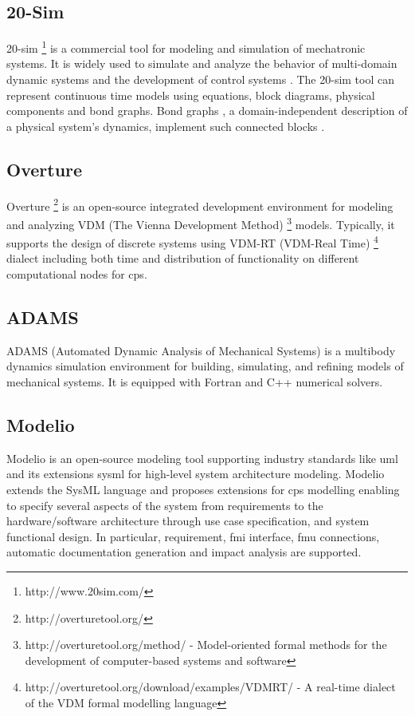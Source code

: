 \subsection{20-Sim}
\label{susec:20sim}


20-sim \footnote{http://www.20sim.com/} is a commercial tool for modeling and simulation of mechatronic systems. It  is widely used to simulate and analyze the behavior of multi-domain dynamic systems and the development of control systems \cite{20sim,20simduindam,20simjan}. The 20-sim tool can represent continuous time models using equations, block diagrams, physical components and bond graphs. Bond graphs \cite{20simgawthrop}, a domain-independent description of a physical system's dynamics, implement such connected blocks . 


\subsection{Overture}
\label{sec:overture}

Overture \footnote{http://overturetool.org/} is an open-source integrated development environment for modeling and analyzing VDM (The Vienna Development Method) \footnote{http://overturetool.org/method/ - Model-oriented formal methods for the development of computer-based systems and software} models. Typically, it supports \cite{overtureverhoef} the design of discrete systems using VDM-RT (VDM-Real Time) \footnote{http://overturetool.org/download/examples/VDMRT/ - A real-time dialect of the VDM formal modelling language} dialect including both time and distribution of functionality on different computational nodes for \acrshort{cps}.


\subsection{ADAMS}
\label{sec:adams}

ADAMS (Automated Dynamic Analysis of Mechanical Systems) \cite{adams} is a multibody dynamics simulation environment for building, simulating, and refining models of mechanical systems. It is equipped with Fortran and C++ numerical solvers. 

\subsection{Modelio}
\label{sec:modelio}

Modelio \cite{modelio} is an open-source modeling tool supporting industry standards like \acrshort{uml} and its extensions \acrshort{sysml} for high-level system architecture modeling. Modelio extends the SysML language \cite{sysml, sysmlmorgan} and proposes extensions for \acrshort{cps} modelling enabling to specify several aspects of the system from requirements to the hardware/software architecture through use case specification, and system functional design. In particular, requirement, \acrshort{fmi} interface, \acrshort{fmu} connections, automatic documentation generation and impact analysis are supported. 

